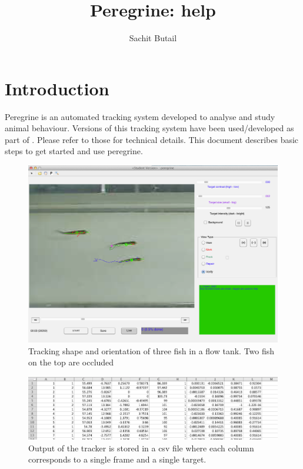\documentclass[12pt]{article}
\title{Peregrine: help}
\author{Sachit Butail}
\date{}
\begin{document}
\maketitle
\thispagestyle{empty}
\pagestyle{empty}



\section{Introduction}
Peregrine is an automated tracking system developed to analyse and study animal behaviour. Versions of this tracking system have been used/developed as part of \cite{Butail2011,Butail2012b,Butail2012c, Butail2013c, Ladu2014, Bartolini2014}. Please refer to those for technical details. This document describes basic steps to get started and use peregrine. 

\begin{figure}[ht]
\centering
\includegraphics[width=.995\linewidth]{screenshot}
\caption{Tracking shape and orientation of three fish in a flow tank. Two fish on the top are occluded}
\label{fig:sample_tracks}
\end{figure}

\begin{figure}[ht]
\centering
\includegraphics[width=.995\linewidth]{output}
\caption{Output of the tracker is stored in a csv file where each column corresponds to a single frame and a single target.}
\label{fig:output}
\end{figure}
\end{document}
